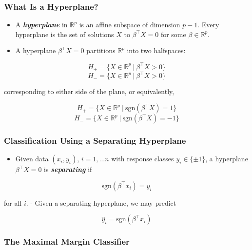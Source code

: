 \documentclass[11pt]{article}
\providecommand{\tightlist}{%
      \setlength{\itemsep}{0pt}\setlength{\parskip}{0pt}}
\begin{document}
    \hypertarget{what-is-a-hyperplane}{%
\subsubsection{What Is a Hyperplane?}\label{what-is-a-hyperplane}}

    \begin{itemize}
\tightlist
\item
  A \textbf{\emph{hyperplane}} in \(\mathbb{R}^p\) is an affine subspace
  of dimension \(p-1\). Every hyperplane is the set of solutions \(X\)
  to \(\beta^\top X = 0\) for some \(\beta\in\mathbb{R}^p\).
\item
  A hyperplane \(\beta^\top X = 0\) partitions \(\mathbb{R}^p\) into two
  halfspaces:
\end{itemize}

\[H_+ = \{X\in\mathbb{R}^p\ |\ \beta^\top X > 0\}\]
\[H_- = \{X\in\mathbb{R}^p\ |\ \beta^\top X > 0\}\]

corresponding to either side of the plane, or equivalently,

\[H_+ = \{X\in\mathbb{R}^p\ |\ \text{sgn}(\beta^\top X) =  1\}\]
\[H_- = \{X\in\mathbb{R}^p\ |\ \text{sgn}(\beta^\top X) =  -1\}\]

    \hypertarget{classification-using-a-separating-hyperplane}{%
\subsubsection{Classification Using a Separating
Hyperplane}\label{classification-using-a-separating-hyperplane}}

    \begin{itemize}
\tightlist
\item
  Given data \((x_i, y_i)\), \(i = 1,\dots n\) with response classes
  \(y_i \in \{ \pm 1\}\), a hyperplane \(\beta^\top X = 0\) is
  \textbf{\emph{separating}} if
\end{itemize}

\[\text{sgn}(\beta^\top x_i) = y_i\]

for all \(i\). - Given a separating hyperplane, we may predict

\[\hat{y}_i = \text{sgn}(\beta^\top x_i)\]

    \hypertarget{the-maximal-margin-classifier}{%
\subsubsection{The Maximal Margin
Classifier}\label{the-maximal-margin-classifier}}
\end{document}
